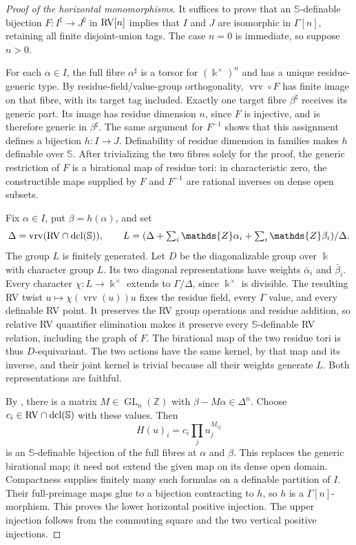 \documentclass[12pt]{amsart}
\theoremstyle{plain}
\theoremstyle{definition}
\theoremstyle{remark}
\numberwithin{equation}{section}
\theoremstyle{plain}
\newcommand{\RV}{\textup{RV}}
\DeclareMathOperator{\dcl}{dcl}
\DeclareMathOperator{\K}{\mathds{k}}
\newcommand{\Z}{\mathds{Z}}
\newcommand{\0}{\emptyset}
\newcommand{\fun}{\longrightarrow}
\newcommand{\efun}{\longmapsto}
\DeclareMathOperator{\vrv}{vrv}
\begin{document}
\begin{proof}[Proof of the horizontal monomorphisms]
It suffices to prove that an $\mathbb S$-definable bijection
$F:I^\sharp\fun J^\sharp$ in $\RV[n]$ implies that $I$ and $J$ are
isomorphic in $\Gamma[n]$, retaining all finite disjoint-union tags.
The case $n=0$ is immediate, so suppose $n>0$.

For each $\alpha\in I$, the full fibre $\alpha^\sharp$ is a torsor
for $(\K^\times)^n$ and has a unique residue-generic type. By
residue-field/value-group orthogonality, $\vrv\circ F$ has finite
image on that fibre, with its target tag included. Exactly one target
fibre $\beta^\sharp$ receives its generic part. Its image has residue
dimension $n$, since $F$ is injective, and is therefore generic in
$\beta^\sharp$. The same argument for $F^{-1}$ shows that this
assignment defines a bijection $h:I\fun J$. Definability of residue
dimension in families makes $h$ definable over $\mathbb S$.
After trivializing the two fibres solely for the proof, the generic
restriction of $F$ is a birational map of residue tori: in
characteristic zero, the constructible maps supplied by $F$ and
$F^{-1}$ are rational inverses on dense open subsets.

Fix $\alpha\in I$, put $\beta=h(\alpha)$, and set
\[
 \Delta=\vrv(\RV\cap\dcl(\mathbb S)),\qquad
 L=(\Delta+\textstyle\sum_i\Z\alpha_i+\sum_i\Z\beta_i)/\Delta.
\]
The group $L$ is finitely generated. Let $D$ be the diagonalizable
group over $\K$ with character group $L$. Its two diagonal
representations have weights $\bar\alpha_i$ and $\bar\beta_i$.
Every character $\chi:L\fun\K^\times$ extends to $\Gamma/\Delta$,
since $\K^\times$ is divisible. The resulting RV twist
$u\efun\chi(\vrv(u))u$ fixes the residue field, every $\Gamma$ value,
and every definable RV point. It preserves the RV group operations
and residue addition, so relative RV quantifier elimination makes
it preserve every $\mathbb S$-definable RV relation, including the
graph of $F$. The birational map of the two residue tori is thus
$D$-equivariant. The two actions have the same kernel, by that map
and its inverse, and their joint kernel is trivial because all their
weights generate $L$. Both representations are faithful.

By \cite[Theorem~7.1 and Corollary~2.5]{reichstein:youssin:birational},
there is a matrix $M\in\operatorname{GL}_n(\Z)$ with
$\beta-M\alpha\in\Delta^n$. Choose
$c_i\in\RV\cap\dcl(\mathbb S)$ with these values. Then
\[
 H(u)_i=c_i\prod_j u_j^{M_{ij}}
\]
is an $\mathbb S$-definable bijection of the full fibres at $\alpha$
and $\beta$. This replaces the generic birational map; it need not
extend the given map on its dense open domain. Compactness supplies
finitely many such formulas on a definable partition of $I$.
Their full-preimage maps glue to a bijection contracting to $h$,
so $h$ is a $\Gamma[n]$-morphism. This proves the lower horizontal
positive injection. The upper injection follows from the commuting
square and the two vertical positive injections.
\end{proof}
\end{document}
